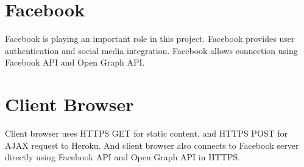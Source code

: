 \section{Facebook}
Facebook is playing an important role in this project. Facebook provides user authentication and social media integration. Facebook allows connection using Facebook API and Open Graph API.

\section{Client Browser}
Client browser uses HTTPS GET for static content, and HTTPS POST for AJAX request to Heroku. And client browser also connects to Facebook server directly using Facebook API and Open Graph API in HTTPS.
 
